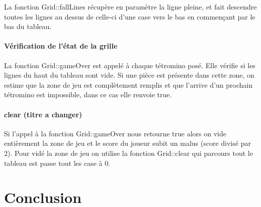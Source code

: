 \documentclass[a4paper, 12pt]{article}
\begin{document}
			La fonction Grid::fallLines récupère en paramètre la ligne pleine, et fait descendre toutes les lignes au dessus de celle-ci d’une case vers le bas en commençant par le bas du tableau.

			\paragraph{Vérification de l’état de la grille}

			La fonction Grid::gameOver est appelé à chaque tétromino posé. Elle vérifie si les lignes du haut du tableau sont vide. Si une pièce est présente dans cette zone, on estime que la zone de jeu est complètement remplis et que l’arrive d’un prochain tétromino est impossible, dans ce cas elle renvoie true.

			\paragraph{clear (titre a changer)}

			Si l’appel à la fonction Grid::gameOver nous retourne true alors on vide entièrement la zone de jeu et le score du joueur subit un malus (score divisé par 2). 
			Pour vidé la zone de jeu on utilise la fonction Grid::clear qui parcours tout le tableau est passe tout les case à 0.

	

\section*{Conclusion}
\end{document}
